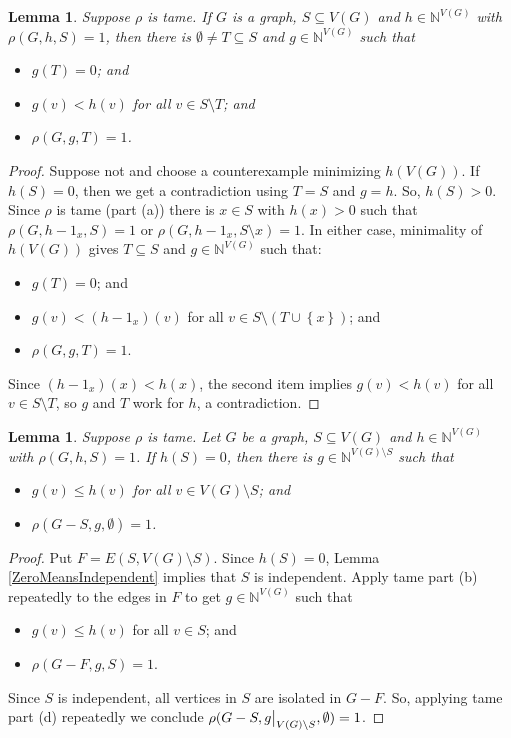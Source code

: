 \documentclass[12pt]{article}
\theoremstyle{plain}
\newtheorem{lem}[thm]{Lemma}
\theoremstyle{definition}
\theoremstyle{remark}
\newcommand{\IN}{\mathbb{N}}
\newcommand{\set}[1]{\left\{ #1 \right\}}
\newcommand\restr[2]{{%
  \left.\kern-\nulldelimiterspace %
  #1 %
  \vphantom{\big|} %
  \right|_{#2} %
  }}
\begin{document}
\begin{lem}\label{GetSuperStable}
	Suppose $\rho$ is tame. If $G$ is a graph, $S \subseteq V(G)$ and $h \in \IN^{V(G)}$ with $\rho(G, h, S) = 1$, then there is $\emptyset \ne T \subseteq S$ and $g \in \IN^{V(G)}$ such that
	\begin{itemize}
		\item $g(T) = 0$; and
		\item $g(v) < h(v)$ for all $v \in S\setminus T$; and
		\item $\rho(G, g, T) = 1$.
	\end{itemize}
\end{lem}
\begin{proof}
	Suppose not and choose a counterexample minimizing $h(V(G))$.  If $h(S) = 0$, then we get a contradiction using $T = S$ and $g=h$.  So, $h(S) > 0$. Since $\rho$ is tame (part (a)) there is $x \in S$ with $h(x) > 0$ such that $\rho(G, h - 1_x, S) = 1$ or $\rho(G, h - 1_x, S \setminus x) = 1$.  In either case, minimality of $h(V(G))$ gives $T \subseteq S$ and $g \in \IN^{V(G)}$ such that:
		\begin{itemize}
			\item $g(T) = 0$; and
			\item $g(v) < (h - 1_x)(v)$ for all $v \in S\setminus (T \cup \set{x})$; and
			\item $\rho(G, g, T) = 1$.
		\end{itemize}
		Since $(h - 1_x)(x) < h(x)$, the second item implies $g(v) < h(v)$ for all $v \in S\setminus T$, so $g$ and $T$ work for $h$, a contradiction.
\end{proof}

\begin{lem}\label{CutOff}
	Suppose $\rho$ is tame. Let $G$ be a graph, $S \subseteq V(G)$ and $h \in \IN^{V(G)}$ with $\rho(G, h, S) = 1$.  If $h(S) = 0$, then there is $g \in \IN^{V(G) \setminus S}$ such that
	\begin{itemize}
		\item $g(v) \le h(v)$ for all $v \in V(G) \setminus S$; and
		\item $\rho(G - S, g, \emptyset) = 1$.
	\end{itemize}
\end{lem}
\begin{proof}
	Put $F = E(S, V(G) \setminus S)$. Since $h(S) = 0$, Lemma \ref{ZeroMeansIndependent} implies that $S$ is independent. Apply tame part (b) repeatedly to the edges in $F$ to get $g \in \IN^{V(G)}$ such that
	\begin{itemize}
		\item $g(v) \le h(v)$ for all $v \in S$; and
		\item $\rho(G - F, g, S) = 1$.
	\end{itemize}
	 Since $S$ is independent, all vertices in $S$ are isolated in $G-F$.  So, applying tame part (d) repeatedly we conclude $\rho(G - S, \restr{g}{V(G) \setminus S}, \emptyset) = 1$.
\end{proof}
\end{document}
